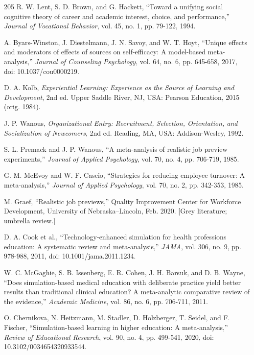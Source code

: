 \begin{thebibliography}{205}
 R. W. Lent, S. D. Brown, and G. Hackett, ``Toward a unifying social cognitive theory of career and academic interest, choice, and performance,'' \textit{Journal of Vocational Behavior}, vol. 45, no. 1, pp. 79-122, 1994.

 A. Byars-\allowbreak{}Winston, J. Diestelmann, J. N. Savoy, and W. T. Hoyt, ``Unique effects and moderators of effects of sources on self-\allowbreak{}efficacy: A model-based meta-\allowbreak{}analysis,'' \textit{Journal of Counseling Psychology}, vol. 64, no. 6, pp. 645-658, 2017, doi: 10.\allowbreak{}1037/\allowbreak{}cou0000219.

 D. A. Kolb, \textit{Experiential Learning: Experience as the Source of Learning and Development}, 2nd ed. Upper Saddle River, NJ, USA: Pearson Education, 2015 (orig. 1984).

 J. P. Wanous, \textit{Organizational Entry: Recruitment, Selection, Orientation, and Socialization of Newcomers}, 2nd ed. Reading, MA, USA: Addison-\allowbreak{}Wesley, 1992.

 S. L. Premack and J. P. Wanous, ``A meta-\allowbreak{}analysis of realistic job preview experiments,'' \textit{Journal of Applied Psychology}, vol. 70, no. 4, pp. 706-719, 1985.

 G. M. McEvoy and W. F. Cascio, ``Strategies for reducing employee turnover: A meta-\allowbreak{}analysis,'' \textit{Journal of Applied Psychology}, vol. 70, no. 2, pp. 342-353, 1985.

 M. Graef, ``Realistic job previews,'' Quality Improvement Center for Workforce Development, University of Nebraska--Lincoln, Feb. 2020. [Grey literature; umbrella review.]

 D. A. Cook et al., ``Technology-\allowbreak{}enhanced simulation for health professions education: A systematic review and meta-\allowbreak{}analysis,'' \textit{JAMA}, vol. 306, no. 9, pp. 978-988, 2011, doi: 10.\allowbreak{}1001/\allowbreak{}jama.\allowbreak{}2011.\allowbreak{}1234.

 W. C. McGaghie, S. B. Issenberg, E. R. Cohen, J. H. Barsuk, and D. B. Wayne, ``Does simulation-\allowbreak{}based medical education with deliberate practice yield better results than traditional clinical education? A meta-\allowbreak{}analytic comparative review of the evidence,'' \textit{Academic Medicine}, vol. 86, no. 6, pp. 706-711, 2011.

 O. Chernikova, N. Heitzmann, M. Stadler, D. Holzberger, T. Seidel, and F. Fischer, ``Simulation-\allowbreak{}based learning in higher education: A meta-\allowbreak{}analysis,'' \textit{Review of Educational Research}, vol. 90, no. 4, pp. 499-541, 2020, doi: 10.\allowbreak{}3102/\allowbreak{}0034654320933544.


\end{thebibliography}

